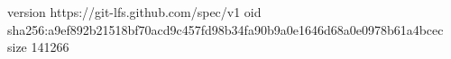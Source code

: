 version https://git-lfs.github.com/spec/v1
oid sha256:a9ef892b21518bf70acd9c457fd98b34fa90b9a0e1646d68a0e0978b61a4bcec
size 141266
